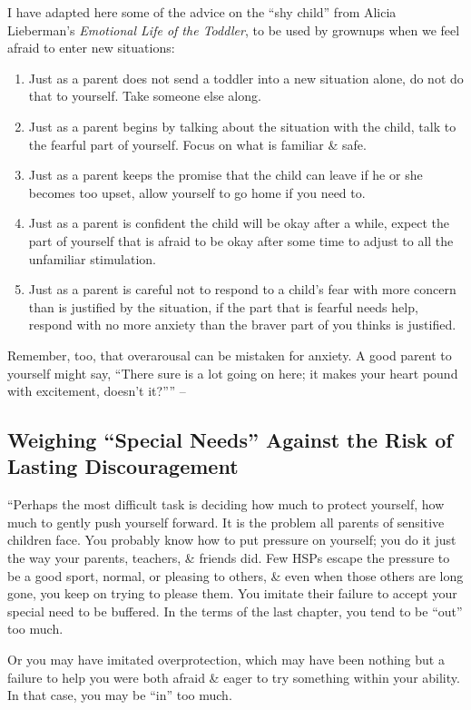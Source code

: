 \documentclass{article}
\numberwithin{equation}{section}
\begin{document}
I have adapted here some of the advice on the ``shy child'' from Alicia Lieberman's \textit{Emotional Life of the Toddler}, to be used by grownups when we feel afraid to enter new situations:
\begin{enumerate}
	\item Just as a parent does not send a toddler into a new situation alone, do not do that to yourself. Take someone else along.
	\item Just as a parent begins by talking about the situation with the child, talk to the fearful part of yourself. Focus on what is familiar \& safe.
	\item Just as a parent keeps the promise that the child can leave if he or she becomes too upset, allow yourself to go home if you need to.
	\item Just as a parent is confident the child will be okay after a while, expect the part of yourself that is afraid to be okay after some time to adjust to all the unfamiliar stimulation.
	\item Just as a parent is careful not to respond to a child's fear with more concern than is justified by the situation, if the part that is fearful needs help, respond with no more anxiety than the braver part of you thinks is justified.
\end{enumerate}
Remember, too, that overarousal can be mistaken for anxiety. A good parent to yourself might say, ``There sure is a lot going on here; it makes your heart pound with excitement, doesn't it?'''' -- \cite[pp. 109--111]{Aron2013}

\subsection{Weighing ``Special Needs'' Against the Risk of Lasting Discouragement}
``Perhaps the most difficult task is deciding how much to protect yourself, how much to gently push yourself forward. It is the problem all parents of sensitive children face. You probably know how to put pressure on yourself; you do it just the way your parents, teachers, \& friends did. Few HSPs escape the pressure to be a good sport, normal, or pleasing to others, \& even when those others are long gone, you keep on trying to please them. You imitate their failure to accept your special need to be buffered. In the terms of the last chapter, you tend to be ``out'' too much.

Or you may have imitated overprotection, which may have been nothing but a failure to help you were both afraid \& eager to try something within your ability. In that case, you may be ``in'' too much.
\end{document}
